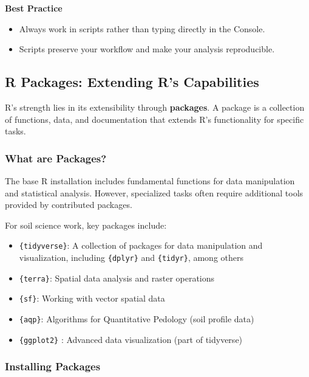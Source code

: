 \documentclass[
  10pt,
  b5paper,
  oneside]{book}
\begin{document}
\textbf{Best Practice}

\begin{itemize}
\item
  Always work in scripts rather than typing directly in the Console.
\item
  Scripts preserve your workflow and make your analysis reproducible.
\end{itemize}

\subsection{R Packages: Extending R's Capabilities}\label{r-packages-extending-rs-capabilities}

R's strength lies in its extensibility through \textbf{packages}.
A package is a collection of functions, data, and documentation that extends R's functionality for specific tasks.

\subsubsection{What are Packages?}\label{what-are-packages}

The base R installation includes fundamental functions for data manipulation and statistical analysis.
However, specialized tasks often require additional tools provided by contributed packages.

For soil science work, key packages include:

\begin{itemize}
\item
  \texttt{\{tidyverse\}}: A collection of packages for data manipulation and visualization, including \texttt{\{dplyr\}} and \texttt{\{tidyr\}}, among others
\item
  \texttt{\{terra\}}: Spatial data analysis and raster operations
\item
  \texttt{\{sf\}}: Working with vector spatial data
\item
  \texttt{\{aqp\}}: Algorithms for Quantitative Pedology (soil profile data)
\item
  \texttt{\{ggplot2\}} : Advanced data visualization (part of tidyverse)
\end{itemize}

\subsubsection{Installing Packages}\label{installing-packages}
\end{document}
